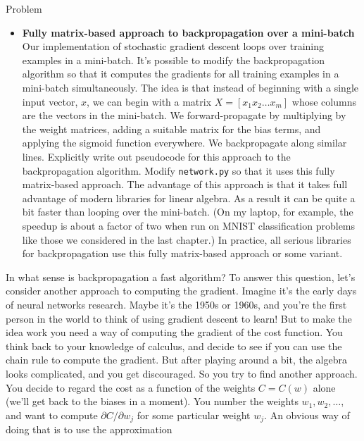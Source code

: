 \begin{exerciseBox}{Problem}


\begin{itemize}

\item \textbf{Fully matrix-based approach to backpropagation over a mini-batch} Our implementation of stochastic gradient descent loops over training examples in a mini-batch. It's possible to modify the backpropagation algorithm so that it computes the gradients for all training examples in a mini-batch simultaneously. The idea is that instead of beginning with a single input vector, $x$, we can begin with a matrix $X = [x_1 x_2 \ldots x_m]$ whose columns are the vectors in the mini-batch. We forward-propagate by multiplying by the weight matrices, adding a suitable matrix for the bias terms, and applying the sigmoid function everywhere. We backpropagate along similar lines. Explicitly write out pseudocode for this approach to the backpropagation algorithm. Modify \texttt{network.py} so that it uses this fully matrix-based approach. The advantage of this approach is that it takes full advantage of modern libraries for linear algebra. As a result it can be quite a bit faster than looping over the mini-batch. (On my laptop, for example, the speedup is about a factor of two when run on MNIST classification problems like those we considered in the last chapter.) In practice, all serious libraries for backpropagation use this fully matrix-based approach or some variant.

\end{itemize}

\end{exerciseBox}





In what sense is backpropagation a fast algorithm? To answer this question, let's consider another approach to computing the gradient. Imagine it's the early days of neural networks research. Maybe it's the 1950s or 1960s, and you're the first person in the world to think of using gradient descent to learn! But to make the idea work you need a way of computing the gradient of the cost function. You think back to your knowledge of calculus, and decide to see if you can use the chain rule to compute the gradient. But after playing around a bit, the algebra looks complicated, and you get discouraged. So you try to find another approach. You decide to regard the cost as a function of the weights $C = C(w)$ alone (we'll get back to the biases in a moment). You number the weights $w_1, w_2, \ldots$, and want to compute $\partial C / \partial w_j$ for some particular weight $w_j$. An obvious way of doing that is to use the approximation

